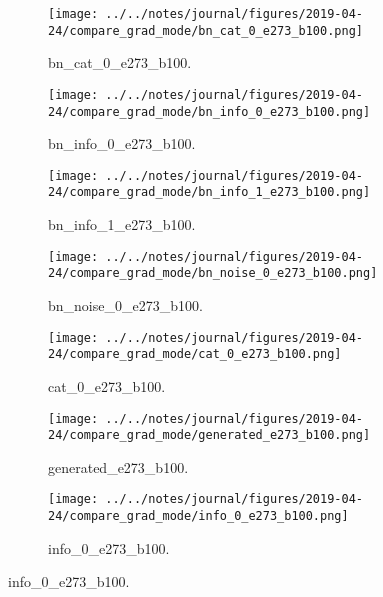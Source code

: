 \begin{figure}[!htbp]
   \centering
\begin{subfigure}[t]{0.48\textwidth}
   \texttt{[image: ../../notes/journal/figures/2019-04-24/compare\_grad\_mode/bn\_cat\_0\_e273\_b100.png]}
   \caption{bn_cat_0_e273_b100.}
   \label{fig:.._.._notes_journal_figures_2019-04-24_compare_grad_mode-a}
\end{subfigure}
\begin{subfigure}[t]{0.48\textwidth}
   \texttt{[image: ../../notes/journal/figures/2019-04-24/compare\_grad\_mode/bn\_info\_0\_e273\_b100.png]}
   \caption{bn_info_0_e273_b100.}
   \label{fig:.._.._notes_journal_figures_2019-04-24_compare_grad_mode-b}
\end{subfigure}
\begin{subfigure}[t]{0.48\textwidth}
   \texttt{[image: ../../notes/journal/figures/2019-04-24/compare\_grad\_mode/bn\_info\_1\_e273\_b100.png]}
   \caption{bn_info_1_e273_b100.}
   \label{fig:.._.._notes_journal_figures_2019-04-24_compare_grad_mode-c}
\end{subfigure}
\begin{subfigure}[t]{0.48\textwidth}
   \texttt{[image: ../../notes/journal/figures/2019-04-24/compare\_grad\_mode/bn\_noise\_0\_e273\_b100.png]}
   \caption{bn_noise_0_e273_b100.}
   \label{fig:.._.._notes_journal_figures_2019-04-24_compare_grad_mode-d}
\end{subfigure}
\begin{subfigure}[t]{0.48\textwidth}
   \texttt{[image: ../../notes/journal/figures/2019-04-24/compare\_grad\_mode/cat\_0\_e273\_b100.png]}
   \caption{cat_0_e273_b100.}
   \label{fig:.._.._notes_journal_figures_2019-04-24_compare_grad_mode-e}
\end{subfigure}
\begin{subfigure}[t]{0.48\textwidth}
   \texttt{[image: ../../notes/journal/figures/2019-04-24/compare\_grad\_mode/generated\_e273\_b100.png]}
   \caption{generated_e273_b100.}
   \label{fig:.._.._notes_journal_figures_2019-04-24_compare_grad_mode-f}
\end{subfigure}
\begin{subfigure}[t]{0.48\textwidth}
   \texttt{[image: ../../notes/journal/figures/2019-04-24/compare\_grad\_mode/info\_0\_e273\_b100.png]}
   \caption{info_0_e273_b100.}
   \label{fig:.._.._notes_journal_figures_2019-04-24_compare_grad_mode-g}
\end{subfigure}

\end{figure}
